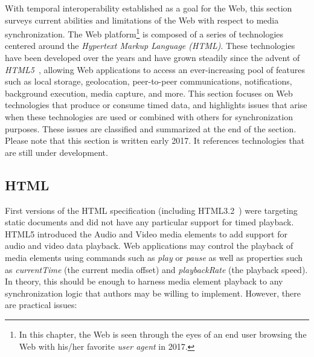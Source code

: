 With temporal interoperability established as a goal for the Web, this section
surveys current abilities and limitations of the Web with respect to
media synchronization. The Web platform\footnote{In this chapter, the Web is
seen through the eyes of an end user browsing the Web with his/her favorite
\emph{user agent} in 2017.} is composed of a series of technologies centered
around the \emph{Hypertext Markup Language (HTML)}. These technologies have
been developed over the years and have grown steadily since the advent of
\emph{HTML5}~\cite{html5}, allowing Web applications to access an  ever-increasing 
pool of features such as local storage, geo{\-}location, peer-to-peer
communications, notifications, background execution, media capture, and more.
This section focuses on Web technologies that produce or
consume timed data, and highlights issues that arise when these technologies
are used or combined with others for synchronization purposes. These issues
are classified and summarized at the end of the section. Please note that this
section is written early 2017. It references technologies that are still under
development.

\subsection {HTML}
\label{sec:web-html}

First versions of the HTML specification (including HTML3.2~\cite{html32}) were
targeting static documents and did not have any particular support for timed playback. 
HTML5 introduced the Audio and Video media elements to add support for
\mbox{audio} and video data playback. Web applications may control the playback of
media elements using commands such as \emph{play} or \emph{pause} as well as
properties such as \mbox{\emph{currentTime}} (the current media offset)
and \emph{playbackRate} (the playback speed). In theory, this should be enough
to harness media element playback to any synchronization logic that authors
may be willing to implement. However, there are practical issues:

